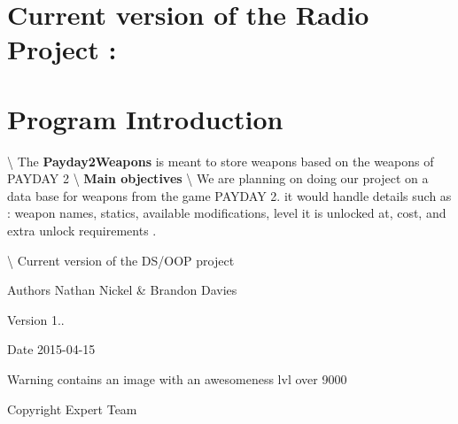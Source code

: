 \hypertarget{index_version}{}\section{Current version of the Radio Project \+:}\label{index_version}
\hypertarget{index_intro}{}\section{Program Introduction}\label{index_intro}
\textbackslash{} The {\bfseries Payday2\+Weapons} is meant to store weapons based on the weapons of P\+A\+Y\+D\+A\+Y 2 \textbackslash{} {\bfseries Main objectives} \textbackslash{} We are planning on doing our project on a data base for weapons from the game P\+A\+Y\+D\+A\+Y 2. it would handle details such as \+: weapon names, statics, available modifications, level it is unlocked at, cost, and extra unlock requirements .



 \textbackslash{} Current version of the D\+S/\+O\+O\+P project 
\begin{DoxyItemize}
\item \begin{DoxyAuthor}{Authors}
Nathan Nickel \& Brandon Davies 
\end{DoxyAuthor}

\item \begin{DoxyVersion}{Version}
1.. 
\end{DoxyVersion}

\item \begin{DoxyDate}{Date}
2015-\/04-\/15 
\end{DoxyDate}

\item \begin{DoxyWarning}{Warning}
contains an image with an awesomeness lvl over 9000 
\end{DoxyWarning}

\item \begin{DoxyCopyright}{Copyright}
Expert Team 
\end{DoxyCopyright}

\end{DoxyItemize}